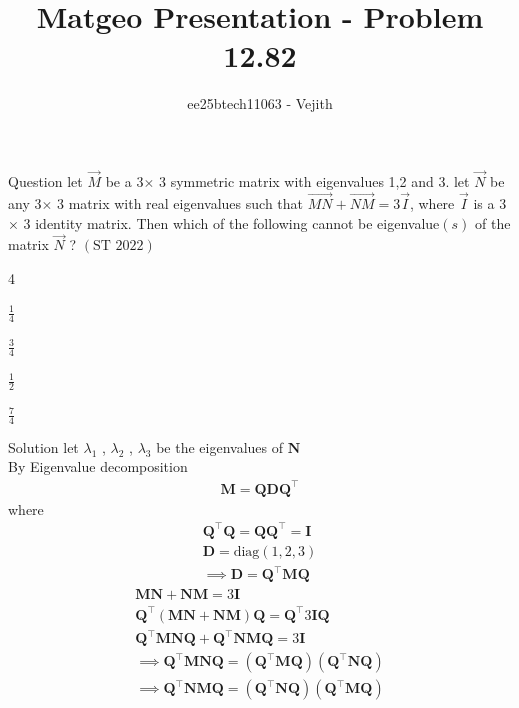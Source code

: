 \documentclass{beamer}
\title{Matgeo Presentation - Problem 12.82}
\author{ee25btech11063 - Vejith}
\numberwithin{equation}{section}
\providecommand{\brak}[1]{\ensuremath{\left(#1\right)}}
\theoremstyle{remark}
\let\vec\mathbf
\begin{document}
\frame{\titlepage}
\begin{frame}{Question}
let $\Vec{M}$ be a 3$\times$ 3 symmetric matrix with eigenvalues 1,2 and 3. let $\Vec{N}$ be any 3$\times$ 3  matrix with real eigenvalues such that $\Vec{MN} + \Vec{NM}= 3\Vec{I}$, where $\Vec{I}$ is a 3$\times$ 3  identity matrix. Then which of the following cannot be eigenvalue\brak{s} of the matrix $\Vec{N}$ ?
\hspace{2cm}\brak{\text{ST } 2022}
\begin{enumerate}[label=\alph*)]
    \begin{multicols}{4}
  \item $\frac{1}{4}$        
  \item $\frac{3}{4}$
  \item $\frac{1}{2}$
  \item $\frac{7}{4}$  
    \end{multicols}
\end{enumerate}
\end{frame}

\begin{frame}{Solution}
    let $\lambda_1$  , $\lambda_2$ , $\lambda_3$ be the eigenvalues of $\vec{N}$\\
By Eigenvalue decomposition
\begin{align}
    \vec{M}=\vec{QDQ}^\vec{\top}
\end{align}
where 
\begin{align}
    \vec{Q}^\top\vec{Q}=\vec{Q}\vec{Q}^\top=\vec{I}\\
    \vec{D}=\text{diag}\brak{1,2 ,3}\\
    \implies \vec{D}=\vec{Q}^\top\vec{M}\vec{Q}
\end{align}
\begin{align}
    \vec{MN}+\vec{NM}=3\vec{I}\\
    \vec{Q}^\top\brak{ \vec{MN}+\vec{NM}}\vec{Q}=\vec{Q}^\top 3\vec{I}\vec{Q}\\
    \vec{Q}^\top\vec{MN}\vec{Q} + \vec{Q}^\top\vec{NM}\vec{Q}=3\vec{I}\\
  \implies  \vec{Q}^\top\vec{MN}\vec{Q}=\brak{\vec{Q}^\top\vec{M}\vec{Q}}\brak{\vec{Q}^\top\vec{N}\vec{Q}}\\
  \implies  \vec{Q}^\top\vec{NM}\vec{Q}=\brak{\vec{Q}^\top\vec{N}\vec{Q}}\brak{\vec{Q}^\top\vec{M}\vec{Q}}
\end{align}
\end{frame}
\end{document}
